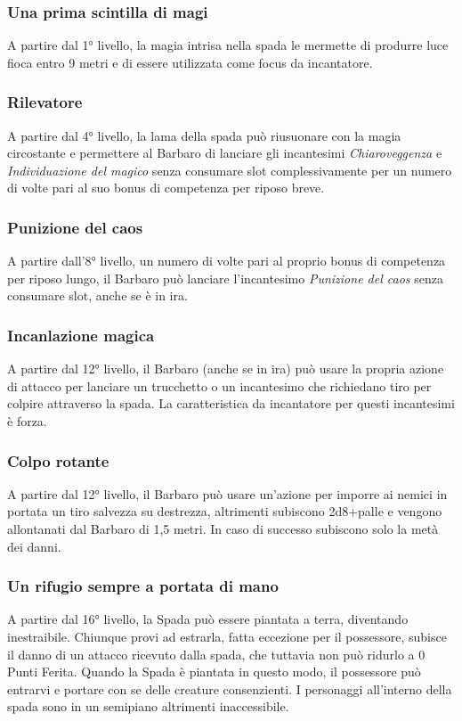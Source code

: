 \subsubsection{Una prima scintilla di magi}
A partire dal 1° livello, la magia intrisa nella spada le mermette di produrre luce fioca entro 9 metri e di essere utilizzata come focus da incantatore. 

\subsubsection{Rilevatore}
A partire dal 4° livello, la lama della spada può riusuonare con la magia circostante e permettere al Barbaro di lanciare gli incantesimi \textit{Chiaroveggenza} e \textit{Individuazione del magico} senza consumare slot complessivamente per un numero di volte pari al suo bonus di competenza per riposo breve.

\subsubsection{Punizione del caos}
A partire dall'8° livello, un numero di volte pari al proprio bonus di competenza per riposo lungo, il Barbaro può lanciare l'incantesimo \textit{Punizione del caos} senza consumare slot, anche se è in ira. 

\subsubsection{Incanlazione magica}
A partire dal 12° livello, il Barbaro (anche se in ira) può usare la propria azione di attacco per lanciare un trucchetto o un incantesimo che richiedano tiro per colpire attraverso la spada. La caratteristica da incantatore per questi incantesimi è forza. 

\subsubsection{Colpo rotante}
A partire dal 12° livello, il Barbaro può usare un'azione per imporre ai nemici in portata un tiro salvezza su destrezza, altrimenti subiscono 2d8+palle e vengono allontanati dal Barbaro di 1,5 metri. In caso di successo subiscono solo la metà dei danni.

\subsubsection{Un rifugio sempre a portata di mano}
A partire dal 16° livello, la Spada può essere piantata a terra, diventando inestraibile. Chiunque provi ad estrarla, fatta eccezione per il possessore, subisce il danno di un attacco ricevuto dalla spada, che tuttavia non può ridurlo a 0 Punti Ferita. Quando la Spada è piantata in questo modo, il possessore può entrarvi e portare con se delle creature consenzienti. I personaggi all'interno della spada sono in un semipiano altrimenti inaccessibile.

